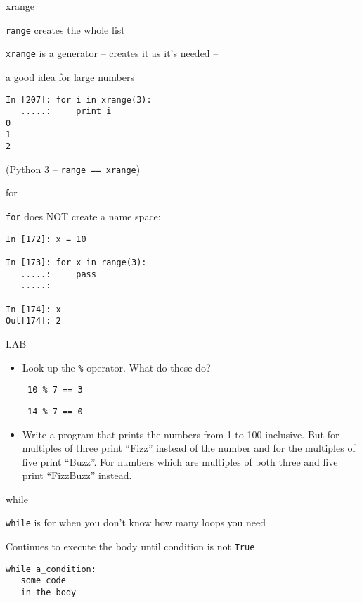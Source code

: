 \documentclass{beamer}
\begin{document}
\begin{frame}[fragile]{xrange}

{\Large \verb|range| creates the whole list}

\vfill
{\Large \verb|xrange| is a generator -- creates it as it's needed --}

\vfill
{\Large a good idea for large numbers}

\begin{verbatim}
In [207]: for i in xrange(3):
   .....:     print i
0
1
2
\end{verbatim}
(Python 3 -- \verb|range == xrange|)
\end{frame}



\begin{frame}[fragile]{for}

{\Large \verb|for| does NOT create a name space:}

\begin{verbatim}
In [172]: x = 10

In [173]: for x in range(3):
   .....:     pass
   .....: 

In [174]: x
Out[174]: 2
\end{verbatim}
\end{frame}

\begin{frame}[fragile]{LAB}

\begin{itemize}

  \item Look up the \verb+%+ operator. What do these do?

    \verb| 10 % 7 == 3 |

    \verb| 14 % 7 == 0 |

  \item  Write a program that prints the numbers from 1 to 100 inclusive.
But for multiples of three print ``Fizz'' instead of the number and for the
multiples of five print ``Buzz''. For numbers which are multiples of both three
and five print ``FizzBuzz'' instead.

\end{itemize}

\end{frame}


\begin{frame}[fragile]{while}

{\Large \verb|while| is for when you don't know how many loops you need}

\vfill
{\Large Continues to execute the body until condition is not \verb|True|}

\begin{verbatim}
while a_condition:
   some_code
   in_the_body
\end{verbatim}
\end{frame}
\end{document}
